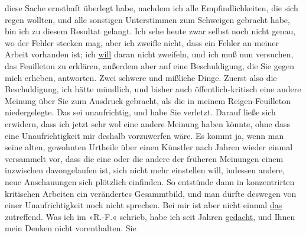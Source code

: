 \begin{ledgroupsized}[t]{13cm}
               diese Sache ernsthaft überlegt habe, nachdem ich alle Empfindlichkeiten, die sich
               regen wollten, und alle sonstigen Unterstimmen zum Schweigen gebracht habe, bin ich
               zu diesem Resultat gelangt. Ich sehe heute zwar selbst noch nicht genau, wo der
               Fehler stecken mag, aber ich zweifle nicht, dass ein Fehler an meiner Arbeit
               vorhanden ist; ich \uline{will} daran nicht zweifeln, und ich
               muß nun versuchen, das Feuilleton zu erklären, außerdem aber auf eine Beschuldigung, die Sie gegen
               mich erheben, antworten. Zwei schwere und mißliche Dinge. \pend
           \pstart
           Zuerst also die Beschuldigung, ich hätte mündlich, und bisher auch
               öffentlich-kritisch eine andere Meinung über Sie zum Ausdruck gebracht, als die in
               meinem Reigen-Feuilleton
               niedergelegte. Das sei unaufrichtig, und habe Sie verletzt. \pend
           \pstart
           Darauf ließe sich erwidern, dass ich jetzt sehr wol eine andere Meinung haben könnte,
               ohne dass eine Unaufrichtigkeit mir deshalb vorzuwerfen wäre. Es kommt ja, wenn man
               seine alten, gewohnten Urtheile über einen Künstler nach Jahren wieder einmal
               versammelt \introOben{}vor\introOben{}, dass die eine oder die andere der früheren
               Meinungen einem inzwischen davongelaufen ist, sich nicht mehr einstellen will,
               indessen andere, neue Anschauungen sich plötzlich einfinden. So entstünde dann in
                  \label{T_L03353-1v}\label{T_L03353-1h}
               konzentrirten kritischen Arbeiten ein verändertes Gesammtbild, und man dürfte
               deswegen von einer Unaufrichtigkeit noch nicht sprechen. Bei mir ist aber nicht
               einmal \uline{das} zutreffend. Was ich im »R.-F.« schrieb, habe ich seit Jahren \uline{gedacht}, und Ihnen mein Denken nicht vorenthalten. Sie

\end{ledgroupsized}
